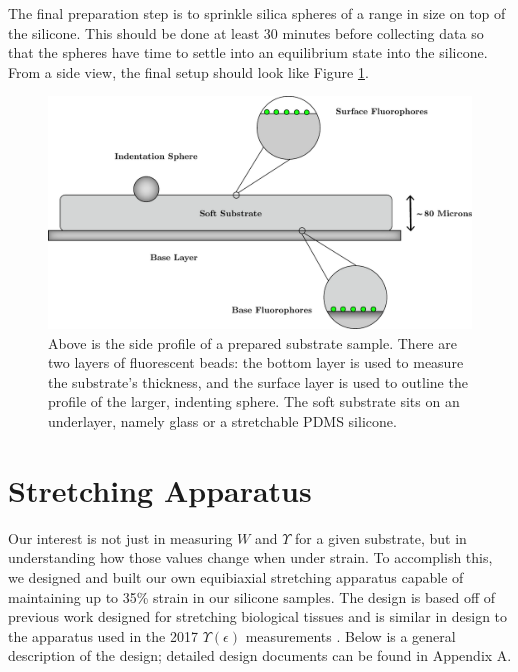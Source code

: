The final preparation step is to sprinkle silica spheres of a range in size on top of the silicone. This should be done at least 30 minutes before collecting data so that the spheres have time to settle into an equilibrium state into the silicone. From a side view, the final setup should look like Figure \ref{fig:substrategraphic}.
\begin{figure}[h!]
	\centering
	\includegraphics[width=.9\linewidth]{Chapters/Figures/substrate_graphic_new}
	\caption[Prepared Substrate Profile]{Above is the side profile of a prepared substrate sample. There are two layers of fluorescent beads: the bottom layer is used to measure the substrate's thickness, and the surface layer is used to outline the profile of the larger, indenting sphere. The soft substrate sits on an underlayer, namely glass or a stretchable PDMS silicone.}
	\label{fig:substrategraphic}
\end{figure}


\section{Stretching Apparatus}
Our interest is not just in  measuring $W$ and $\Upsilon$ for a given substrate, but in understanding how those values change when under strain. To accomplish this, we designed and built our own equibiaxial stretching apparatus capable of maintaining up to 35\% strain in our silicone samples. The design is based off of previous work designed for stretching biological tissues \cite{na2008time} and is similar in design to the apparatus used in the 2017 $\Upsilon(\epsilon)$ measurements \cite{xu2017direct}. Below is a general description of the design; detailed design documents can be found in Appendix A.

